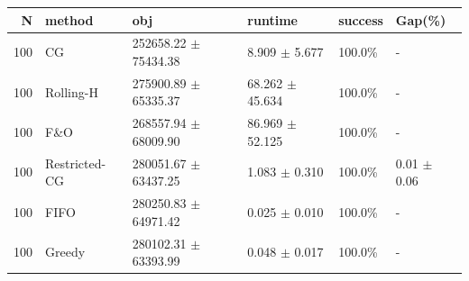 \begin{tabular}{rlllll}
\toprule
N & method & obj & runtime & success & Gap(\%) \\
\midrule
100 & CG & 252658.22 $\pm$ 75434.38 & 8.909 $\pm$ 5.677 & 100.0\% & - \\
100 & Rolling-H & 275900.89 $\pm$ 65335.37 & 68.262 $\pm$ 45.634 & 100.0\% & - \\
100 & F\&O & 268557.94 $\pm$ 68009.90 & 86.969 $\pm$ 52.125 & 100.0\% & - \\
100 & Restricted-CG & 280051.67 $\pm$ 63437.25 & 1.083 $\pm$ 0.310 & 100.0\% & 0.01 $\pm$ 0.06 \\
100 & FIFO & 280250.83 $\pm$ 64971.42 & 0.025 $\pm$ 0.010 & 100.0\% & - \\
100 & Greedy & 280102.31 $\pm$ 63393.99 & 0.048 $\pm$ 0.017 & 100.0\% & - \\
\bottomrule
\end{tabular}

